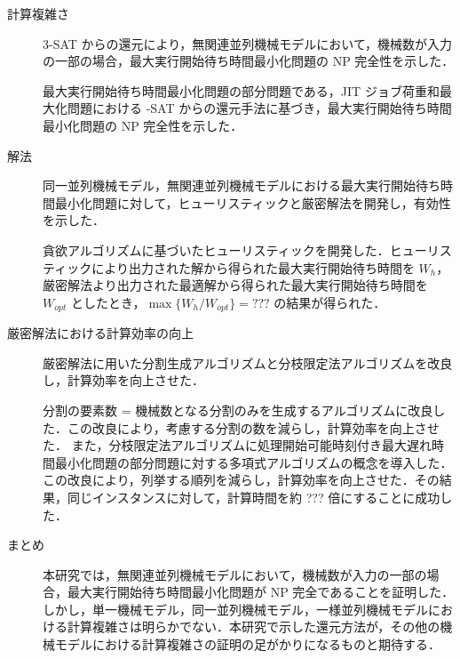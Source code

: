 \documentclass[12pt]{optlab-bachelor}
\begin{document}
\begin{description}
  \item[計算複雑さ ] \textsc{3-SAT} からの還元により，無関連並列機械モデルにおいて，機械数が入力の一部の場合，最大実行開始待ち時間最小化問題の NP 完全性を示した．

  最大実行開始待ち時間最小化問題の部分問題である，JIT ジョブ荷重和最大化問題における {-SAT} からの還元手法に基づき，最大実行開始待ち時間最小化問題の NP  完全性を示した．

  \item[解法 ] 同一並列機械モデル，無関連並列機械モデルにおける最大実行開始待ち時間最小化問題に対して，ヒューリスティックと厳密解法を開発し，有効性を示した．

  貪欲アルゴリズムに基づいたヒューリスティックを開発した．ヒューリスティックにより出力された解から得られた最大実行開始待ち時間を $W_h$，厳密解法より出力された最適解から得られた最大実行開始待ち時間を $W_{opt}$ としたとき，$\max\big\{W_h/W_{opt}\big\} = ???$ の結果が得られた．

  \item[厳密解法における計算効率の向上 ] 厳密解法に用いた分割生成アルゴリズムと分枝限定法アルゴリズムを改良し，計算効率を向上させた．

  分割の要素数 = 機械数となる分割のみを生成するアルゴリズムに改良した．この改良により，考慮する分割の数を減らし，計算効率を向上させた．
  また，分枝限定法アルゴリズムに処理開始可能時刻付き最大遅れ時間最小化問題の部分問題に対する多項式アルゴリズムの概念を導入した．この改良により，列挙する順列を減らし，計算効率を向上させた．その結果，同じインスタンスに対して，計算時間を約 ??? 倍にすることに成功した．

  \item[まとめ ] 本研究では，無関連並列機械モデルにおいて，機械数が入力の一部の場合，最大実行開始待ち時間最小化問題が NP 完全であることを証明した．しかし，単一機械モデル，同一並列機械モデル，一様並列機械モデルにおける計算複雑さは明らかでない．本研究で示した還元方法が，その他の機械モデルにおける計算複雑さの証明の足がかりになるものと期待する．
\end{description}
\end{document}
